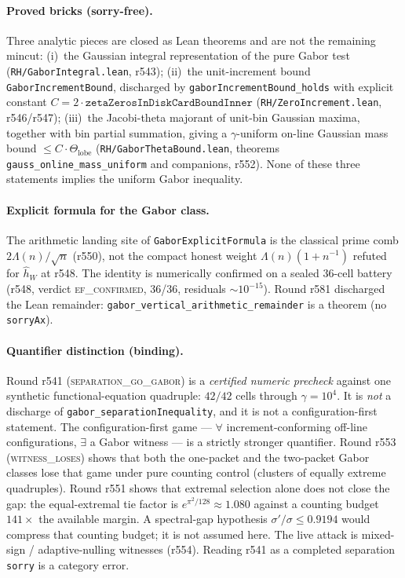 \documentclass[11pt]{article}
\theoremstyle{definition}
\theoremstyle{remark}
\begin{document}
\paragraph{Proved bricks (sorry-free).}
Three analytic pieces are closed as Lean theorems and are not the
remaining mincut:
(i)~the Gaussian integral representation of the pure Gabor test
(\texttt{RH/GaborIntegral.lean}, r543);
(ii)~the unit-increment bound \texttt{GaborIncrementBound}, discharged by
\texttt{gaborIncrementBound\_holds} with explicit constant
$C=2\cdot\texttt{zetaZerosInDiskCardBoundInner}$
(\texttt{RH/ZeroIncrement.lean}, r546/r547);
(iii)~the Jacobi-theta majorant of unit-bin Gaussian maxima, together with
bin partial summation, giving a $\gamma$-uniform on-line Gaussian mass
bound $\le C\cdot\Theta_{\mathrm{lobe}}$
(\texttt{RH/GaborThetaBound.lean}, theorems
\texttt{gauss\_online\_mass\_uniform} and companions, r552).
None of these three statements implies the uniform Gabor inequality.

\paragraph{Explicit formula for the Gabor class.}
The arithmetic landing site of \texttt{GaborExplicitFormula} is the
classical prime comb $2\Lambda(n)/\sqrt{n}$ (r550), not the compact
honest weight $\Lambda(n)(1+n^{-1})$ refuted for $\hat h_W$ at r548.
The identity is numerically confirmed on a sealed 36-cell battery
(r548, verdict \textsc{ef\_confirmed}, 36/36, residuals
$\sim10^{-15}$).  Round r581 discharged the Lean remainder:
\texttt{gabor\_vertical\_arithmetic\_remainder} is a theorem (no
\texttt{sorryAx}).

\paragraph{Quantifier distinction (binding).}
Round r541 (\textsc{separation\_go\_gabor}) is a \emph{certified numeric
precheck} against one synthetic functional-equation quadruple: $42/42$
cells through $\gamma=10^4$.  It is \emph{not} a discharge of
\texttt{gabor\_separationInequality}, and it is not a configuration-first
statement.  The configuration-first game --- $\forall$ increment-conforming
off-line configurations, $\exists$ a Gabor witness --- is a strictly
stronger quantifier.  Round r553 (\textsc{witness\_loses}) shows that
both the one-packet and the two-packet Gabor classes lose that game
under pure counting control (clusters of equally extreme quadruples).
Round r551 shows that extremal selection alone does not close the gap:
the equal-extremal tie factor is $e^{\pi^2/128}\approx 1.080$ against a
counting budget $141\times$ the available margin.  A spectral-gap
hypothesis $\sigma'/\sigma\le 0.9194$ would compress that counting
budget; it is not assumed here.  The live attack is mixed-sign /
adaptive-nulling witnesses (r554).  Reading r541 as a completed
separation \texttt{sorry} is a category error.
\end{document}
